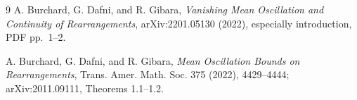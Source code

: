 \documentclass[11pt]{article}
\newcommand{\1}{\mathbf 1}
\begin{document}
\begin{thebibliography}{9}
A. Burchard, G. Dafni, and R. Gibara,
\emph{Vanishing Mean Oscillation and Continuity of Rearrangements},
arXiv:2201.05130 (2022), especially introduction, PDF pp.~1--2.

A. Burchard, G. Dafni, and R. Gibara,
\emph{Mean Oscillation Bounds on Rearrangements},
Trans. Amer. Math. Soc. 375 (2022), 4429--4444;
arXiv:2011.09111, Theorems 1.1--1.2.
\end{thebibliography}
\end{document}
